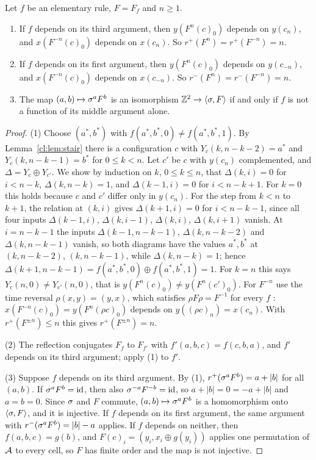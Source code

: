 \begin{theorem}\label{cl:thm:A}
Let $f$ be an elementary rule, $F=F_f$ and $n\ge1$.
\begin{enumerate}
\item If $f$ depends on its third argument, then $y(F^n(c)_0)$ depends on $y(c_n)$, and $x(F^{-n}(c)_0)$ depends on $x(c_n)$. So $r^+(F^n)=r^+(F^{-n})=n$.
\item If $f$ depends on its first argument, then $y(F^n(c)_0)$ depends on $y(c_{-n})$, and $x(F^{-n}(c)_0)$ depends on $x(c_{-n})$. So $r^-(F^n)=r^-(F^{-n})=n$.
\item The map $(a,b)\mapsto\sigma^aF^b$ is an isomorphism $\mathbb{Z}^2\to\langle\sigma,F\rangle$ if and only if $f$ is not a function of its middle argument alone.
\end{enumerate}
\end{theorem}

\begin{proof}
(1) Choose $(a^*,b^*)$ with $f(a^*,b^*,0)\ne f(a^*,b^*,1)$. By Lemma~\ref{cl:lem:stair} there is a configuration $c$ with $Y_c(k,n-k-2)=a^*$ and $Y_c(k,n-k-1)=b^*$ for $0\le k<n$. Let $c'$ be $c$ with $y(c_n)$ complemented, and $\Delta=Y_c\oplus Y_{c'}$. We show by induction on $k$, $0\le k\le n$, that $\Delta(k,i)=0$ for $i<n-k$, $\Delta(k,n-k)=1$, and $\Delta(k-1,i)=0$ for $i<n-k+1$. For $k=0$ this holds because $c$ and $c'$ differ only in $y(c_n)$. For the step from $k<n$ to $k+1$, the relation at $(k,i)$ gives $\Delta(k+1,i)=0$ for $i<n-k-1$, since all four inputs $\Delta(k-1,i)$, $\Delta(k,i-1)$, $\Delta(k,i)$, $\Delta(k,i+1)$ vanish. At $i=n-k-1$ the inputs $\Delta(k-1,n-k-1)$, $\Delta(k,n-k-2)$ and $\Delta(k,n-k-1)$ vanish, so both diagrams have the values $a^*,b^*$ at $(k,n-k-2)$, $(k,n-k-1)$, while $\Delta(k,n-k)=1$; hence $\Delta(k+1,n-k-1)=f(a^*,b^*,0)\oplus f(a^*,b^*,1)=1$. For $k=n$ this says $Y_c(n,0)\ne Y_{c'}(n,0)$, that is $y(F^n(c)_0)\ne y(F^n(c')_0)$. For $F^{-n}$ use the time reversal $\rho(x,y)=(y,x)$, which satisfies $\rho F\rho=F^{-1}$ for every $f$ \cite[p.~2500]{Takesue1987}: $x(F^{-n}(c)_0)=y(F^n(\rho c)_0)$ depends on $y((\rho c)_n)=x(c_n)$. With $r^+(F^{\pm n})\le n$ this gives $r^+(F^{\pm n})=n$.

(2) The reflection conjugates $F_f$ to $F_{f'}$ with $f'(a,b,c)=f(c,b,a)$, and $f'$ depends on its third argument; apply (1) to $f'$.

(3) Suppose $f$ depends on its third argument. By (1), $r^+(\sigma^aF^b)=a+|b|$ for all $(a,b)$. If $\sigma^aF^b=\mathrm{id}$, then also $\sigma^{-a}F^{-b}=\mathrm{id}$, so $a+|b|=0=-a+|b|$ and $a=b=0$. Since $\sigma$ and $F$ commute, $(a,b)\mapsto\sigma^aF^b$ is a homomorphism onto $\langle\sigma,F\rangle$, and it is injective. If $f$ depends on its first argument, the same argument with $r^-(\sigma^aF^b)=|b|-a$ applies. If $f$ depends on neither, then $f(a,b,c)=g(b)$, and $F(c)_i=(y_i,x_i\oplus g(y_i))$ applies one permutation of $\mathcal{A}$ to every cell, so $F$ has finite order and the map is not injective.
\end{proof}


